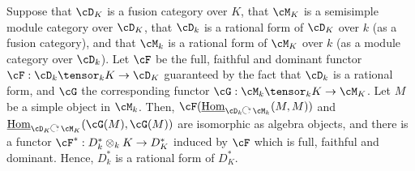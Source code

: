 \begin{lem}
Suppose that $\cD_K$ is a fusion category over $K$, that $\cM_K$ is a semisimple module category over $\cD_K$, that $\cD_k$ is a rational form of $\cD_K$ over $k$ (as a fusion category), and that $\cM_k$ is a rational form of $\cM_K$ over $k$ (as a module category over $\cD_k$).  Let $\cF$ be the full, faithful and dominant functor $\cF: \cD_k \tensor_k K \rightarrow \cD_K$ guaranteed by the fact that $\cD_k$ is a rational form, and $\cG$ the corresponding functor $\cG:\cM_k \tensor_k K \to \cM_K$.  Let $M$ be a simple object in $\cM_k$.  Then, $\cF( \iHom_{\cD_k \actson \cM_k}(M,M))$ and $\iHom_{\cD_K \actson \cM_K}(\cG(M),\cG(M))$ are isomorphic as algebra objects, and there is a  functor $\cF^*: D_k^*\otimes_k K \rightarrow D_K^*$ induced by $\cF$ which is full, faithful and dominant.  Hence, $D_k^*$ is a rational form of $D_K^*$.
\end{lem}
